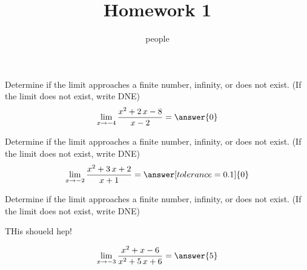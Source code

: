 \documentclass[•]{ximera}
\title{Homework 1}
\author{people}
\begin{document}
\maketitle


\begin{problem}
Determine if the limit approaches a finite number, infinity, or does not exist. (If the limit does not exist, write DNE)
\[\lim_{x\to{{-4}}}\dfrac{{{x^{2} + 2 \, x - 8}}}{{{x - 2}}}=\answer{0}\]
\end{problem}%




\begin{problem}
Determine if the limit approaches a finite number, infinity, or does not exist. (If the limit does not exist, write DNE)
\[\lim_{x\to{{-2}}}\dfrac{{{x^{2} + 3 \, x + 2}}}{{{x + 1}}}=\answer[tolerance=0.1]{0}\]
\end{problem}%



\begin{problem}
Determine if the limit approaches a finite number, infinity, or does not exist. (If the limit does not exist, write DNE)
\begin{expandable}
THis shoueld hep!
\end{expandable}


\[\lim_{x\to{{-3}}}\dfrac{{{x^{2} + x - 6}}}{{{x^{2} + 5 \, x + 6}}}=\answer{{{5}}}\]
\end{problem}%
\end{document}

